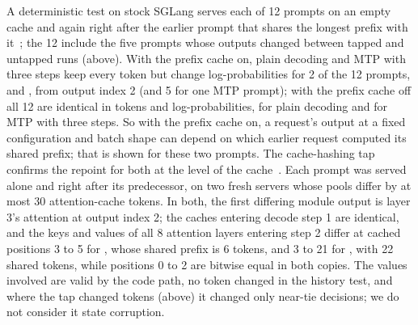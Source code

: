 A deterministic test on stock SGLang serves each of 12 prompts on an empty cache and again right after the earlier prompt that shares the longest prefix with it~; the 12 include the five prompts whose outputs changed between tapped and untapped runs (above). With the prefix cache on, plain decoding and MTP with three steps keep every token but change log-probabilities for 2 of the 12 prompts,  and , from output index 2 (and 5 for one MTP prompt); with the prefix cache off all 12 are identical in tokens and log-probabilities, for plain decoding and for MTP with three steps. So with the prefix cache on, a request's output at a fixed configuration and batch shape can depend on which earlier request computed its shared prefix; that is shown for these two prompts. The cache-hashing tap confirms the repoint for both at the level of the cache~. Each prompt was served alone and right after its predecessor, on two fresh servers whose pools differ by at most 30 attention-cache tokens. In both, the first differing module output is layer 3's attention at output index 2; the caches entering decode step 1 are identical, and the keys and values of all 8 attention layers entering step 2 differ at cached positions 3 to 5 for , whose shared prefix is 6 tokens, and 3 to 21 for , with 22 shared tokens, while positions 0 to 2 are bitwise equal in both copies. The values involved are valid by the code path, no token changed in the history test, and where the tap changed tokens (above) it changed only near-tie decisions; we do not consider it state corruption.

